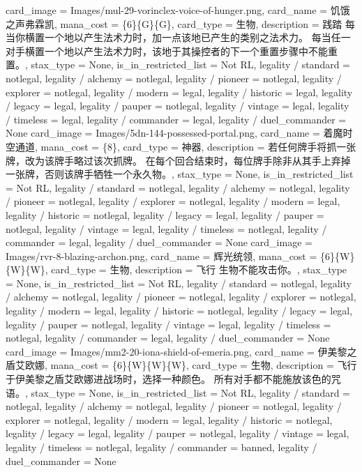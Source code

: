 \documentclass[lang = cn, color = black, 10pt]{AllThatStax}
\begin{document}
\card
{
	card_image = Images/mul-29-vorinclex-voice-of-hunger.png,
	card_name = 饥饿之声弗霖凯,
	mana_cost = \{6\}\{G\}\{G\},
	card_type = 生物,
	description = 践踏
	每当你横置一个地以产生法术力时，加一点该地已产生的类别之法术力。
	每当任一对手横置一个地以产生法术力时，该地于其操控者的下一个重置步骤中不能重置。,
	stax_type = None,
	is_in_restricted_list = Not RL,
	legality / standard = notlegal,
	legality / alchemy = notlegal,
	legality / pioneer = notlegal,
	legality / explorer = notlegal,
	legality / modern = legal,
	legality / historic = legal,
	legality / legacy = legal,
	legality / pauper = notlegal,
	legality / vintage = legal,
	legality / timeless = legal,
	legality / commander = legal,
	legality / duel_commander = None
}
\card
{
	card_image = Images/5dn-144-possessed-portal.png,
	card_name = 着魔时空通道,
	mana_cost = \{8\},
	card_type = 神器,
	description = 若任何牌手将抓一张牌，改为该牌手略过该次抓牌。
	在每个回合结束时，每位牌手除非从其手上弃掉一张牌，否则该牌手牺牲一个永久物。,
	stax_type = None,
	is_in_restricted_list = Not RL,
	legality / standard = notlegal,
	legality / alchemy = notlegal,
	legality / pioneer = notlegal,
	legality / explorer = notlegal,
	legality / modern = legal,
	legality / historic = notlegal,
	legality / legacy = legal,
	legality / pauper = notlegal,
	legality / vintage = legal,
	legality / timeless = notlegal,
	legality / commander = legal,
	legality / duel_commander = None
}
\card
{
	card_image = Images/rvr-8-blazing-archon.png,
	card_name = 辉光统领,
	mana_cost = \{6\}\{W\}\{W\}\{W\},
	card_type = 生物,
	description = 飞行
	生物不能攻击你。,
	stax_type = None,
	is_in_restricted_list = Not RL,
	legality / standard = notlegal,
	legality / alchemy = notlegal,
	legality / pioneer = notlegal,
	legality / explorer = notlegal,
	legality / modern = legal,
	legality / historic = notlegal,
	legality / legacy = legal,
	legality / pauper = notlegal,
	legality / vintage = legal,
	legality / timeless = notlegal,
	legality / commander = legal,
	legality / duel_commander = None
}
\card
{
	card_image = Images/mm2-20-iona-shield-of-emeria.png,
	card_name = 伊美黎之盾艾欧娜,
	mana_cost = \{6\}\{W\}\{W\}\{W\},
	card_type = 生物,
	description = 飞行
	于伊美黎之盾艾欧娜进战场时，选择一种颜色。
	所有对手都不能施放该色的咒语。,
	stax_type = None,
	is_in_restricted_list = Not RL,
	legality / standard = notlegal,
	legality / alchemy = notlegal,
	legality / pioneer = notlegal,
	legality / explorer = notlegal,
	legality / modern = legal,
	legality / historic = notlegal,
	legality / legacy = legal,
	legality / pauper = notlegal,
	legality / vintage = legal,
	legality / timeless = notlegal,
	legality / commander = banned,
	legality / duel_commander = None
}
\end{document}
